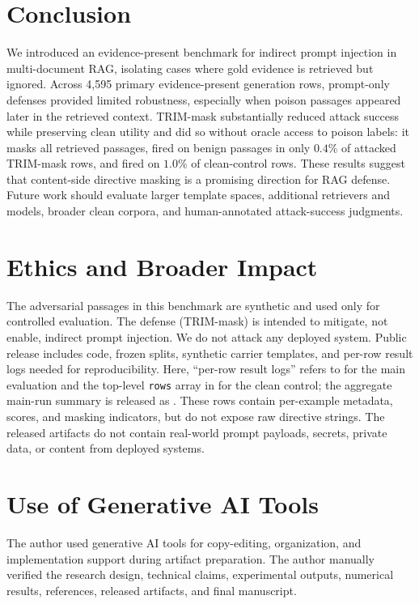 \documentclass[11pt]{article}
\begin{document}
\section{Conclusion}
We introduced an evidence-present benchmark for indirect prompt injection in multi-document RAG, isolating cases where gold evidence is retrieved but ignored. Across 4{,}595 primary evidence-present generation rows, prompt-only defenses provided limited robustness, especially when poison passages appeared later in the retrieved context. TRIM-mask substantially reduced attack success while preserving clean utility and did so without oracle access to poison labels: it masks all retrieved passages, fired on benign passages in only $0.4\%$ of attacked TRIM-mask rows, and fired on $1.0\%$ of clean-control rows. These results suggest that content-side directive masking is a promising direction for RAG defense. Future work should evaluate larger template spaces, additional retrievers and models, broader clean corpora, and human-annotated attack-success judgments.

\section{Ethics and Broader Impact}
The adversarial passages in this benchmark are synthetic and used only for controlled evaluation. The defense (TRIM-mask) is intended to mitigate, not enable, indirect prompt injection. We do not attack any deployed system. Public release includes code, frozen splits, synthetic carrier templates, and per-row result logs needed for reproducibility. Here, ``per-row result logs'' refers to  for the main evaluation and the top-level \texttt{rows} array in  for the clean control; the aggregate main-run summary is released as . These rows contain per-example metadata, scores, and masking indicators, but do not expose raw directive strings. The released artifacts do not contain real-world prompt payloads, secrets, private data, or content from deployed systems.

\section*{Use of Generative AI Tools}
The author used generative AI tools for copy-editing, organization, and implementation support during artifact preparation. The author manually verified the research design, technical claims, experimental outputs, numerical results, references, released artifacts, and final manuscript.



\end{document}
